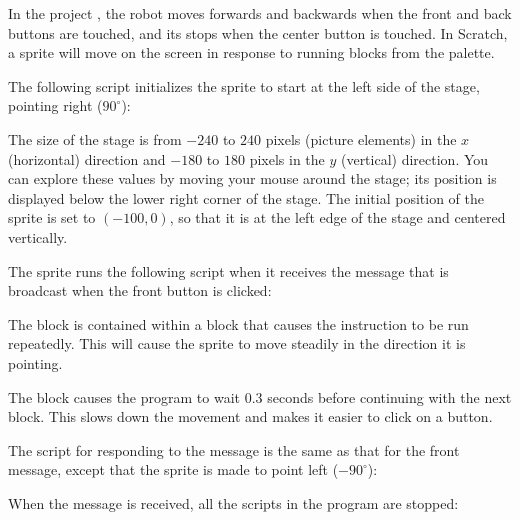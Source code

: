 \label{ch.moving}


In the project , the robot moves forwards and backwards when
the front and back buttons are touched, and its stops when the center
button is touched. In Scratch, a sprite will move on the screen in
response to running blocks from the  palette.

The following script initializes the sprite to start at the left
side of the stage, pointing right ($90^{\circ}$):


The size of the stage is from $-240$ to $240$ pixels (picture elements)
in the $x$ (horizontal) direction and $-180$ to $180$ pixels in the $y$
(vertical) direction. You can explore these values by moving your mouse
around the stage; its position is displayed below the lower right corner
of the stage. The initial position of the  sprite is set to
$(-100,0)$, so that it is at the left edge of the stage and centered
vertically.

The sprite runs the following script when it receives the message
 that is broadcast when the front button is clicked:


The block  is contained within a
 block that causes the instruction to be run
repeatedly. This will cause the sprite to move steadily in the direction
it is pointing.

The  block causes the program to wait 0.3 seconds before
continuing with the next block. This slows down the movement and makes
it easier to click on a button.

The script for responding to the  message is the same as that
for the front message, except that the sprite is made to point left
($-90^{\circ}$):


When the  message is received, all the scripts in the
program are stopped:




